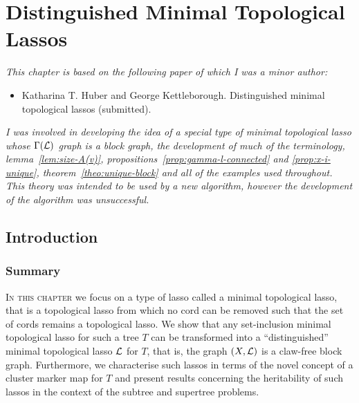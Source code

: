 \chapter{Distinguished Minimal Topological Lassos}
\label{cha:dist-minim-topl}

\textit{This chapter is based on the following paper of which I was a minor
  author:}

\vspace{0.5em}

\noindent

\begin{itemize}
\item Katharina T. Huber and George Kettleborough. Distinguished minimal
  topological lassos (submitted).
\end{itemize}

\vspace{1em}

\textit{I was involved in developing the idea of a special type of minimal
  topological lasso whose $\Gamma({\mathcal L})$ graph is a block graph, the
  development of much of the terminology, lemma~\ref{lem:size-A(v)},
  propositions~\ref{prop:gamma-l-connected} and \ref{prop:x-i-unique},
  theorem~\ref{theo:unique-block} and all of the examples used throughout.
  This theory was intended to be used by a new algorithm, however the
  development of the algorithm was unsuccessful.}
\newpage

\section{Introduction}

\subsection{Summary}

\textsc{In this chapter} we focus on a type of lasso called a minimal
topological lasso, that is a topological lasso from which no cord can be
removed such that the set of cords remains a topological lasso.  We show that
any set-inclusion minimal topological lasso for such a tree $T$ can be
transformed into a ``distinguished'' minimal topological lasso ${\mathcal L}$ for $T$,
that is, the graph $(X,{\mathcal L})$ is a claw-free block graph. Furthermore, we
characterise such lassos in terms of the novel concept of a cluster marker map
for $T$ and present results concerning the heritability of such lassos in the
context of the subtree and supertree problems.

